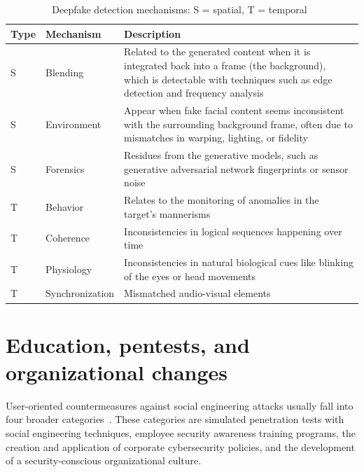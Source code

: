 \begin{table}[ht!]  
\centering
\renewcommand{\arraystretch}{1.5} %
\setlength{\tabcolsep}{5pt} %
\begin{tabularx}{\textwidth}{|l|l|X|} %
\hline  
\textbf{Type} & \textbf{Mechanism} & \textbf{Description} \\ \hline  
S & Blending & Related to the generated content when it is integrated back into a frame (the background), which is detectable with techniques such as edge detection and frequency analysis \\ \hline  
S & Environment & Appear when fake facial content seems inconsistent
with the surrounding background frame, often due to mismatches in warping, lighting, or
fidelity \\ \hline  
S & Forensics & Residues from the generative models, such as generative
adversarial network fingerprints or sensor noise \\ \hline  
T & Behavior & Relates to the monitoring of anomalies in the target’s mannerisms \\ \hline  
T & Coherence & Inconsistencies in logical sequences
happening over time\\ \hline  
T & Physiology & Inconsistencies in natural biological cues like blinking of
the eyes or head movements \\ \hline  
T & Synchronization & Mismatched
audio-visual elements \\ \hline  
\end{tabularx}  
\caption{Deepfake detection mechanisms: S = spatial, T = temporal~\citep{mirsky_Creation_Detection_Deepfakes_2021}}  
\label{table:deepfake_artifacts}  
\end{table}  




\section{Education, pentests, and organizational changes}

User-oriented countermeasures against social engineering attacks usually fall into four broader categories~\citep{tsinganos_Towards_Automated_Recognition_Chat_SE_Enterprise_2018, mitnick_The_Art_of_Deception_2003}. These categories are simulated penetration tests with social engineering techniques, employee security awareness training programs, the creation and application of corporate cybersecurity policies, and the development of a security-conscious organizational culture.

